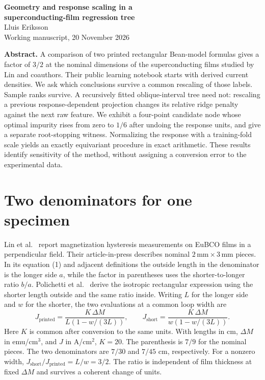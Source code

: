 \documentclass[11pt]{article}
\begin{document}
\begin{center}{\LARGE\bfseries Geometry and response scaling in a\\[3pt] superconducting-film regression tree}\\[8pt]
Lluis Eriksson\\[2pt]\small Working manuscript, 20 November 2026\end{center}
\textbf{Abstract.} A comparison of two printed rectangular Bean-model formulas gives a factor of $3/2$ at the nominal dimensions of the superconducting films studied by Lin and coauthors. Their public learning notebook starts with derived current densities. We ask which conclusions survive a common rescaling of those labels. Sample ranks survive. A recursively fitted oblique-interval tree need not: rescaling a previous response-dependent projection changes its relative ridge penalty against the next raw feature. We exhibit a four-point candidate node whose optimal impurity rises from zero to $1/6$ after undoing the response units, and give a separate root-stopping witness. Normalizing the response with a training-fold scale yields an exactly equivariant procedure in exact arithmetic. These results identify sensitivity of the method, without assigning a conversion error to the experimental data.

\section{Two denominators for one specimen}
Lin et al.\ \cite{lin} report magnetization hysteresis measurements on EuBCO films in a perpendicular field. Their article-in-press describes nominal $2\,\mathrm{mm}\times3\,\mathrm{mm}$ pieces. In its equation (1) and adjacent definitions the outside length in the denominator is the longer side $a$, while the factor in parentheses uses the shorter-to-longer ratio $b/a$. Polichetti et al.\ \cite{pol} derive the isotropic rectangular expression using the shorter length outside and the same ratio inside. Writing $L$ for the longer side and $w$ for the shorter, the two evaluations at a common loop width are
\[
 J_{\mathrm{printed}}=\frac{K\,\Delta M}{L(1-w/(3L))},\qquad
 J_{\mathrm{short}}=\frac{K\,\Delta M}{w(1-w/(3L))}.
\]
Here $K$ is common after conversion to the same units. With lengths in cm, $\Delta M$ in emu/cm$^3$, and $J$ in A/cm$^2$, $K=20$. The parenthesis is $7/9$ for the nominal pieces. The two denominators are $7/30$ and $7/45$ cm, respectively. For a nonzero width, $J_{\mathrm{short}}/J_{\mathrm{printed}}=L/w=3/2$. The ratio is independent of film thickness at fixed $\Delta M$ and survives a coherent change of units.
\end{document}
